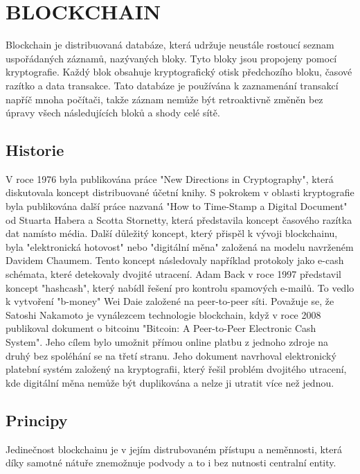 
\section{BLOCKCHAIN}
Blockchain je distribuovaná databáze, která udržuje neustále rostoucí seznam uspořádaných záznamů, nazývaných bloky. Tyto bloky jsou propojeny pomocí kryptografie. Každý blok obsahuje kryptografický otisk předchozího bloku, časové razítko a data transakce. Tato databáze je používána k zaznamenání transakcí napříč mnoha počítači, takže záznam nemůže být retroaktivně změněn bez úpravy všech následujících bloků a shody celé sítě. \cite{blockchainobecne}




\subsection{Historie}
V roce 1976 byla publikována práce "New Directions in Cryptography", která diskutovala koncept distribuované účetní knihy. S pokrokem v oblasti kryptografie byla publikována další práce nazvaná "How to Time-Stamp a Digital Document" od Stuarta Habera a Scotta Stornetty, která představila koncept časového razítka dat namísto média. Další důležitý koncept, který přispěl k vývoji blockchainu, byla "elektronická hotovost" nebo "digitální měna" založená na modelu navrženém Davidem Chaumem. Tento koncept následovaly například protokoly jako e-cash schémata, které detekovaly dvojité utracení. Adam Back v roce 1997 představil koncept "hashcash", který nabídl řešení pro kontrolu spamových e-mailů. To vedlo k vytvoření "b-money" Wei Daie založené na peer-to-peer síti. Považuje se, že Satoshi Nakamoto je vynálezcem technologie blockchain, když v roce 2008 publikoval dokument o bitcoinu "Bitcoin: A Peer-to-Peer Electronic Cash System". Jeho cílem bylo umožnit přímou online platbu z jednoho zdroje na druhý bez spoléhání se na třetí stranu. Jeho dokument navrhoval elektronický platební systém založený na kryptografii, který řešil problém dvojitého utracení, kde digitální měna nemůže být duplikována a nelze ji utratit více než jednou. \cite{blockchainhistory}



\subsection{Principy}
Jedinečnost blockchainu je v jejím distrubovaném přístupu a neměnnosti, která díky samotné nátuře znemožnuje podvody a to i bez nutnosti centralní entity.

